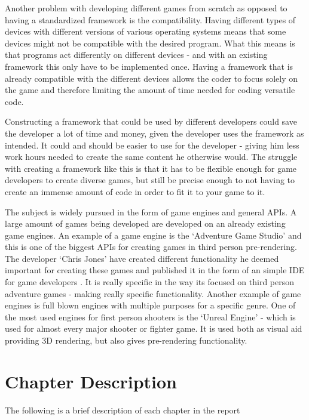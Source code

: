 Another problem with developing different games from scratch as opposed to having a standardized framework is the compatibility. Having different types of devices with different versions of various operating systems means that some devices might not be compatible with the desired program. What this means is that programs act differently on different devices - and with an existing framework this only have to be implemented once. Having a framework that is already compatible with the different devices allows the coder to focus solely on the game and therefore limiting the amount of time needed for coding versatile code.

Constructing a framework that could be used by different developers could save the developer a lot of time and money, given the developer uses the framework as intended. It could and should be easier to use for the developer - giving him less work hours needed to create the same content he otherwise would. The struggle with creating a framework like this is that it has to be flexible enough for game developers to create diverse games, but still be precise enough to not having to create an immense amount of code in order to fit it to your game to it.

The subject is widely pursued in the form of game engines and general APIs. A large amount of games being developed are developed on an already existing game engines. An example of a game engine is the `Adventure Game Studio' and this is one of the biggest APIs for creating games in third person pre-rendering. The developer `Chris Jones' have created different functionality he deemed important for creating these games and published it in the form of an simple IDE for game developers \cite{adv-game}. It is really specific in the way its focused on third person adventure games - making really specific functionality.
Another example of game engines is full blown engines with multiple purposes for a specific genre. One of the most used engines for first person shooters is the `Unreal Engine' - which is used for almost every major shooter or fighter game. It is used both as visual aid providing 3D rendering, but also gives pre-rendering functionality.


\section{Chapter Description}
The following is a brief description of each chapter in the report

